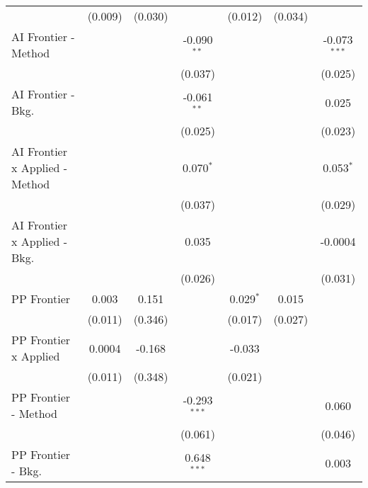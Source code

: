 \begin{tabular}{lcccccc}
                                  & (0.009)        & (0.030)        &                & (0.012)        & (0.034)       &   \\   
   AI Frontier - Method           &                &                & -0.090$^{**}$  &                &               & -0.073$^{***}$\\   
                                  &                &                & (0.037)        &                &               & (0.025)\\   
   AI Frontier - Bkg.             &                &                & -0.061$^{**}$  &                &               & 0.025\\   
                                  &                &                & (0.025)        &                &               & (0.023)\\   
   AI Frontier x Applied - Method &                &                & 0.070$^{*}$    &                &               & 0.053$^{*}$\\   
                                  &                &                & (0.037)        &                &               & (0.029)\\   
   AI Frontier x Applied - Bkg.   &                &                & 0.035          &                &               & -0.0004\\   
                                  &                &                & (0.026)        &                &               & (0.031)\\   
   PP Frontier                    & 0.003          & 0.151          &                & 0.029$^{*}$    & 0.015         &   \\   
                                  & (0.011)        & (0.346)        &                & (0.017)        & (0.027)       &   \\   
   PP Frontier x Applied          & 0.0004         & -0.168         &                & -0.033         &               &   \\   
                                  & (0.011)        & (0.348)        &                & (0.021)        &               &   \\   
   PP Frontier - Method           &                &                & -0.293$^{***}$ &                &               & 0.060\\   
                                  &                &                & (0.061)        &                &               & (0.046)\\   
   PP Frontier - Bkg.             &                &                & 0.648$^{***}$  &                &               & 0.003\\   

\end{tabular}
